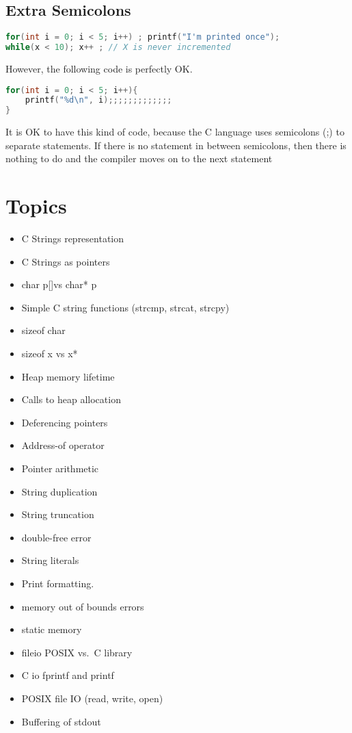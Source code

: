\subsection{Extra Semicolons}\label{extra-semicolons}

\begin{lstlisting}[language=C]
for(int i = 0; i < 5; i++) ; printf("I'm printed once");
while(x < 10); x++ ; // X is never incremented
\end{lstlisting}

However, the following code is perfectly OK.

\begin{lstlisting}[language=C]
for(int i = 0; i < 5; i++){
    printf("%d\n", i);;;;;;;;;;;;;
}
\end{lstlisting}

It is OK to have this kind of code, because the C language uses
semicolons (;) to separate statements. If there is no statement in
between semicolons, then there is nothing to do and the compiler moves
on to the next statement

\section{Topics}

\begin{itemize}
\tightlist
\item
  C Strings representation
\item
  C Strings as pointers
\item
  char p{[}{]}vs char* p
\item
  Simple C string functions (strcmp, strcat, strcpy)
\item
  sizeof char
\item
  sizeof x vs x*
\item
  Heap memory lifetime
\item
  Calls to heap allocation
\item
  Deferencing pointers
\item
  Address-of operator
\item
  Pointer arithmetic
\item
  String duplication
\item
  String truncation
\item
  double-free error
\item
  String literals
\item
  Print formatting.
\item
  memory out of bounds errors
\item
  static memory
\item
  fileio POSIX vs.~C library
\item
  C io fprintf and printf
\item
  POSIX file IO (read, write, open)
\item
  Buffering of stdout
\end{itemize}

